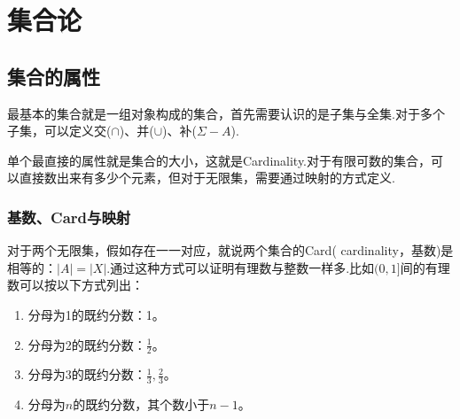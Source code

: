\chapter{集合论}

\section{集合的属性}
最基本的集合就是一组对象构成的集合，首先需要认识的是子集与全集.对于多个子集，可以定义交($\cap$)、并($\cup$)、补($\Sigma-A$).

单个最直接的属性就是集合的大小，这就是Cardinality.对于有限可数的集合，可以直接数出来有多少个元素，但对于无限集，需要通过映射的方式定义.

\subsection{基数、Card与映射}
对于两个无限集，假如存在一一对应，就说两个集合的Card( cardinality，基数)是相等的：$|A|=|X|$.通过这种方式可以证明有理数与整数一样多.比如$(0,1]$间的有理数可以按以下方式列出：
\begin{enumerate}
\item 分母为1的既约分数：1。
\item 分母为2的既约分数：$\frac{1}{2}$。
\item 分母为3的既约分数：$\frac{1}{3},\frac{2}{3}$。
\item 分母为$n$的既约分数，其个数小于$n-1$。
\end{enumerate}

